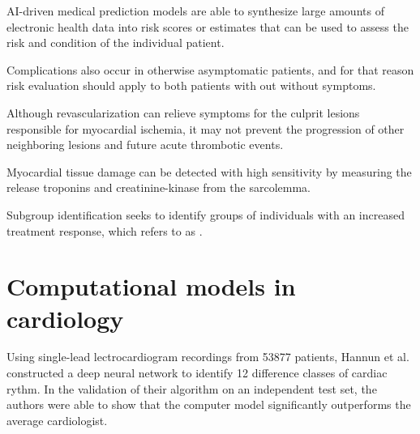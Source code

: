 


AI-driven medical prediction models are able to synthesize large amounts
of electronic health data into risk scores or estimates that can be used
to assess the risk and condition of the individual patient.
~\autocite{handelmanEDoctor2018}

Complications also occur in otherwise asymptomatic patients, 
and for that reason risk evaluation should apply to both patients
with out without symptoms.
~\autocite{knuuti20192020}

Although revascularization can relieve symptoms for the culprit lesions
responsible for myocardial ischemia, it may not prevent the progression
of other neighboring lesions and future acute thrombotic events.
~\autocite{libbyPathophysiology2005}

Myocardial tissue damage can be detected with high sensitivity by measuring 
the release troponins and creatinine-kinase from the sarcolemma.
~\autocite{falkPathogenesis2006}

Subgroup identification seeks to identify groups of individuals with an
increased treatment response, which
\citeauthor{kosorokPrecision2019} refers to as 
.


\section{Computational models in cardiology}

Using single-lead lectrocardiogram recordings from \num{53877} patients,
Hannun et al.\autocite{hannunCardiologistlevel2019}
constructed a deep neural network
to identify 12 difference classes of cardiac rythm.
In the validation of their algorithm on an independent test set,
the authors were able to show that the computer model
significantly outperforms the average cardiologist. 



